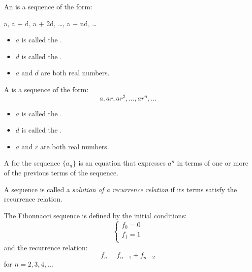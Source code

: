         \par An  is a sequence of the form:
        \begin{eqbox}
            a, a + d, a + 2d, \ldots, a + nd, \ldots
        \end{eqbox}
        \begin{itemize}
            \item $a$ is called the .
            \item $d$ is called the .
            \item $a$ and $d$ are both real numbers.
        \end{itemize}

        \par A  is a sequence of the form:
        \begin{equation}
            a, ar, ar^{2}, \ldots, ar^{n}, \ldots
        \end{equation}
        \begin{itemize}
            \item $a$ is called the .
            \item $d$ is called the .
            \item $a$ and $r$ are both real numbers.
        \end{itemize}

        \par A  for the sequence $\{a_{n}\}$ is an equation that
        expresses $a^{n}$ in terms of one or more of the previous terms of the sequence.
        \par A sequence is called a \textit{solution of a recurrence relation} if its terms
        satisfy the recurrence relation.

        \par The Fibonnacci sequence is defined by the initial conditions:
        \begin{equation}
            \begin{cases}
                f_{0} = 0 \\
                f_{1} = 1 \\
            \end{cases}
        \end{equation}
        and the recurrence relation:
        \begin{equation}
            f_{n} = f_{n - 1} + f_{n - 2}
        \end{equation}
        for $n = 2, 3, 4, \ldots$

